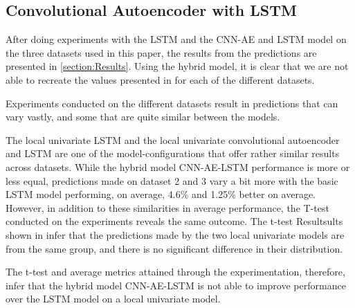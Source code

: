 
\subsection{Convolutional Autoencoder with LSTM}
\label{section:Discussion:Discussion:CNN-AE-LSTM}





After doing experiments with the LSTM and the CNN-AE and LSTM model on the three datasets used in this paper,
the results from the predictions are presented in \cref{section:Results}.
Using the hybrid model, it is clear that we are not able to recreate the values presented in \cite{Zhao2019}
for each of the different datasets.

Experiments conducted on the different datasets result in predictions that can vary vastly,
and some that are quite similar between the models.

The local univariate LSTM and the local univariate convolutional autoencoder and LSTM are one of the model-configurations
that offer rather similar results across datasets.
While the hybrid model CNN-AE-LSTM performance is more or less equal, predictions made on dataset 2 and 3 vary a bit more
with the basic LSTM model performing, on average, 4.6\% and 1.25\% better on average.
However, in addition to these similarities in average performance, the T-test conducted on the experiments reveals the same outcome.
The t-test Resultsults shown in  infer that the predictions made by the two local univariate models
are from the same group, and there is no significant difference in their distribution.

The t-test and average metrics attained through the experimentation, therefore, infer that the hybrid model CNN-AE-LSTM
is not able to improve performance over the LSTM model on a local univariate model.


